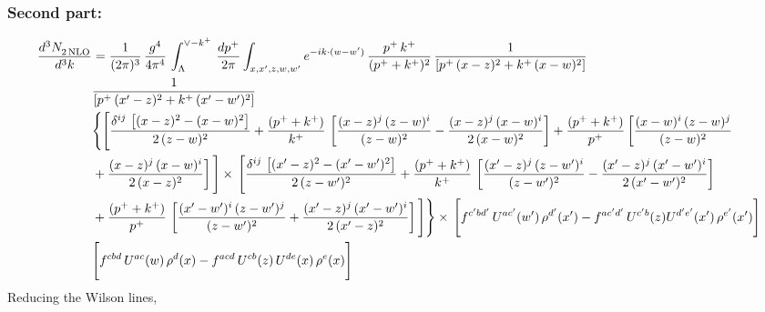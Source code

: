 \documentclass[9pt]{article}
\numberwithin{equation}{section}
\begin{document}
\subsubsection{Second part:\,}
\begin{align}
    \frac{d^{3}N_{2\,\rm NLO}^{\rm}}{d^{3}k}  & = \frac{1}{(2\pi)^{3}}\, \frac{g^{4}}{4\pi^{4}}\,\int_{\Lambda}^{\vee-k^{+}}\, \frac{dp^{+}}{2\pi}\int_{x,x',z,w,w^{\prime}} e^{-ik\cdot (w-w')}\,\frac{p^{+}\,k^{+}}{(p^{+}+k^{+})^{2}}\, \frac{1}{\left[p^{+}\,(x-z)^{2}+k^{+}\,(x-w)^{2}\right]}\,\notag \\ & \frac{1}{\left[p^{+}\,(x'-z)^{2}+k^{+}\,(x'-w')^{2}\right]}\notag \\ & \Bigg\{\Bigg[\frac{\delta^{ij}\, \left[(x-z)^{2}-(x-w)^{2}\right]}{2\,(z-w)^{2}} + \frac{(p^{+}+k^{+})}{k^{+}}\, \left[\frac{(x-z)^{j}\,(z-w)^{i}}{(z-w)^{2}}-\frac{(x-z)^{j}\,(x-w)^{i}}{2\,(x-w)^{2}}\right]+\frac{(p^{+}+k^{+})}{p^{+}}\,\bigg[\frac{(x-w)^{i}\,(z-w)^{j}}{(z-w)^{2}}\notag \\ & +\frac{(x-z)^{j}\,(x-w)^{i}}{2\,(x-z)^{2}}\bigg]\,\Bigg]\times\, \Bigg[\frac{\delta^{ij}\, \left[(x'-z)^{2}-(x'-w')^{2}\right]}{2\,(z-w')^{2}}+ \frac{(p^{+}+k^{+})}{k^{+}}\, \left[\frac{(x'-z)^{j}\,(z-w')^{i}}{(z-w')^{2}}-\frac{(x'-z)^{j}\,(x'-w')^{i}}{2\,(x'-w')^{2}}\right]\notag \\ & +\frac{(p^{+}+k^{+})}{p^{+}}\,\left[\frac{(x'-w')^{i}\,(z-w')^{j}}{(z-w')^{2}} +\frac{(x'-z)^{j}\,(x'-w')^{i}}{2\,(x'-z)^{2}}\right] \Bigg] \Bigg\} \times\, \Bigg[f^{c'bd'}\, U^{ac'}(w')\,\rho^{d'}(x')-f^{ac'd'}\, U^{c'b}(z)U^{d'e'}(x')\, \rho^{e'}(x')\Bigg]\notag \\ & \Bigg[f^{cbd}\, U^{ac}(w)\,\rho^{d}(x) - f^{acd}\, U^{cb}(z)\,U^{de}(x)\, \rho^{e}(x)\Bigg]
\end{align}
Reducing the Wilson lines, 
\end{document}
